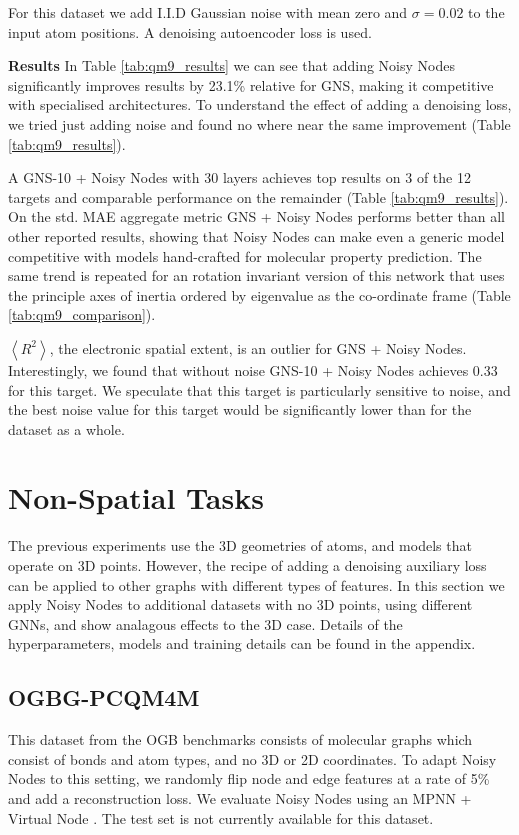 \documentclass{article} \usepackage{iclr2022_conference,times}
\begin{document}
For this dataset we add I.I.D Gaussian noise with mean zero and $\sigma=0.02$ to the input atom positions. A denoising autoencoder loss is used.

\textbf{Results} In Table \ref{tab:qm9_results} we can see that adding Noisy Nodes significantly improves results by 23.1\% relative for GNS, making it competitive with specialised architectures. To understand the effect of adding a denoising loss, we tried just adding noise and found no where near the same improvement (Table \ref{tab:qm9_results}).

A GNS-10 + Noisy Nodes with 30 layers achieves top results on 3 of the 12 targets and comparable performance on the remainder (Table \ref{tab:qm9_results}). On the std. MAE aggregate metric GNS + Noisy Nodes performs better than all other reported results, showing that Noisy Nodes can make even a generic model competitive with models hand-crafted for molecular property prediction. The same trend is repeated for an rotation invariant version of this network that uses the principle axes of inertia ordered by eigenvalue as the co-ordinate frame (Table \ref{tab:qm9_comparison}).

$\left< R^2 \right>$, the electronic spatial extent, is an outlier for GNS + Noisy Nodes. Interestingly, we found that without noise GNS-10 + Noisy Nodes achieves 0.33 for this target. We speculate that this target is particularly sensitive to noise, and the best noise value for this target would be significantly lower than for the dataset as a whole.

\section{Non-Spatial Tasks}

The previous experiments use the 3D geometries of atoms, and models that operate on 3D points. However, the recipe of adding a denoising auxiliary loss can be applied to other graphs with different types of features. In this section we apply Noisy Nodes to additional datasets with no 3D points, using different GNNs, and show analagous effects to the 3D case. Details of the hyperparameters, models and training details can be found in the appendix.

\subsection{OGBG-PCQM4M}

This dataset from the OGB benchmarks consists of molecular graphs which consist of bonds and atom types, and no 3D or 2D coordinates. To adapt Noisy Nodes to this setting, we randomly flip node and edge features at a rate of 5\% and add a reconstruction loss. We evaluate Noisy Nodes using an MPNN  + Virtual Node \citep{Gilmer2017NeuralMP}. The test set is not currently available for this dataset.
\end{document}

